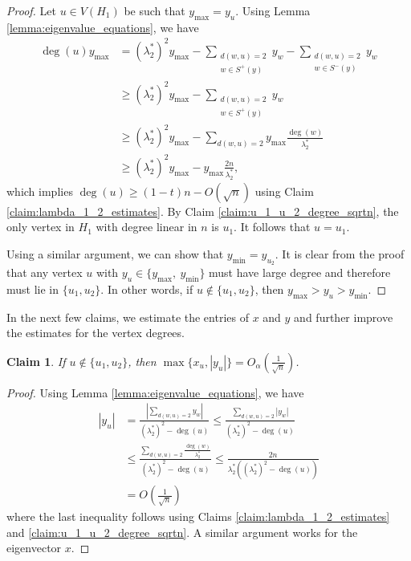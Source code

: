 \documentclass[11pt]{article}
\theoremstyle{plain}
\newtheorem{claim}{Claim}[section]
\numberwithin{equation}{section}
\begin{document}
\begin{proof}
    Let $u\in V(H_1)$ be such that $y_{\max} = y_{u}$. Using Lemma \ref{lemma:eigenvalue_equations}, we have 
    \begin{align*}
        \deg(u)y_{\max} & = (\lambda_2^*)^2 y_{\max} - \sum_{\substack{d(w,u)=2\\ w\in S^+(y) }}y_w - \sum_{\substack{d(w,u)=2\\ w\in S^-(y) }}y_w\\
        & \ge (\lambda_2^*)^2 y_{\max} - \sum_{\substack{d(w,u)=2\\ w\in S^+(y) }}y_w\\
        & \ge (\lambda_2^*)^2 y_{\max} - \sum_{d(w,u)=2} y_{\max}\frac{\deg(w)}{\lambda_2^*}\\
        & \ge (\lambda_2^*)^2 y_{\max} - y_{\max}\frac{2n}{\lambda_2^*}, 
    \end{align*}
    which implies $\deg(u)\ge (1-t)n - O(\sqrt{n})$ using Claim \ref{claim:lambda_1_2_estimates}. By Claim \ref{claim:u_1_u_2_degree_sqrtn}, the only vertex in $H_1$ with degree linear in $n$ is $u_1$. It follows that $u=u_1$.  

    Using a similar argument, we can show that $y_{\min} = y_{u_2}$. It is clear from the proof that any vertex $u$ with $y_u\in \{y_{\max},\ y_{\min}\}$ must have large degree and therefore must lie in $\{u_1, u_2\}$. In other words, if $u\notin \{u_1, u_2\}$, then $y_{\max} > y_u > y_{\min}$.  
\end{proof}

In the next few claims, we estimate the entries of $x$ and $y$ and further improve the estimates for the vertex degrees.

\begin{claim}\label{claim:small_entry_remaining_vertices}
    If $u\notin \{u_1, u_2\}$, then $\max \{x_{u}, |y_u|\} = O_\alpha\left(\frac{1}{\sqrt{n}}\right)$.
\end{claim}

\begin{proof}
Using Lemma \ref{lemma:eigenvalue_equations}, we have
\begin{align*}
   |y_u| & = \frac{|\sum_{d(w,u)=2}y_w|}{(\lambda_2^*)^2 - \deg(u)}  \le \frac{\sum_{d(w,u)=2}|y_w|}{(\lambda_2^*)^2 - \deg(u)} \\
   & \le \frac{\sum_{d(w,u)=2}\frac{\deg(w)}{\lambda_2^*}}{(\lambda_2^*)^2 - \deg(u)}\le \frac{2n}{\lambda_2^*\left((\lambda_2^*)^2 - \deg(u)\right)}\\
   & = O\left(\frac{1}{\sqrt{n}}\right) 
\end{align*}
where the last inequality follows using Claims \ref{claim:lambda_1_2_estimates} and \ref{claim:u_1_u_2_degree_sqrtn}. A similar argument works for the eigenvector $x$.
\end{proof}
\end{document}
